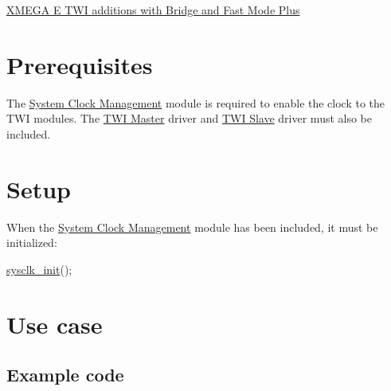 \begin{DoxyItemize}
\item \hyperlink{xmega_twi_xmegae}{X\-M\-E\-G\-A E T\-W\-I additions with Bridge and Fast Mode Plus}
\end{DoxyItemize}\hypertarget{xmega_twi_quickstart_xmega_twi_quickstart_prereq}{}\section{Prerequisites}\label{xmega_twi_quickstart_xmega_twi_quickstart_prereq}
The \hyperlink{group__sysclk__group}{System Clock Management} module is required to enable the clock to the T\-W\-I modules. The \hyperlink{group__group__xmega__drivers__twi__twim}{T\-W\-I Master} driver and \hyperlink{group__group__xmega__drivers__twi__twis}{T\-W\-I Slave} driver must also be included.\hypertarget{xmega_twi_quickstart_xmega_twi_quickstart_setup}{}\section{Setup}\label{xmega_twi_quickstart_xmega_twi_quickstart_setup}
When the \hyperlink{group__sysclk__group}{System Clock Management} module has been included, it must be initialized\-: 
\begin{DoxyCode}
        \hyperlink{group__sysclk__group_ga242399e48a97739c88b4d0c00f6101de}{sysclk\_init}();
\end{DoxyCode}
\hypertarget{xmega_twi_quickstart_xmega_twi_quickstart_use_case}{}\section{Use case}\label{xmega_twi_quickstart_xmega_twi_quickstart_use_case}
\hypertarget{xmega_twi_quickstart_xmega_twi_quickstart_use_case_example_code}{}\subsection{Example code}\label{xmega_twi_quickstart_xmega_twi_quickstart_use_case_example_code}

